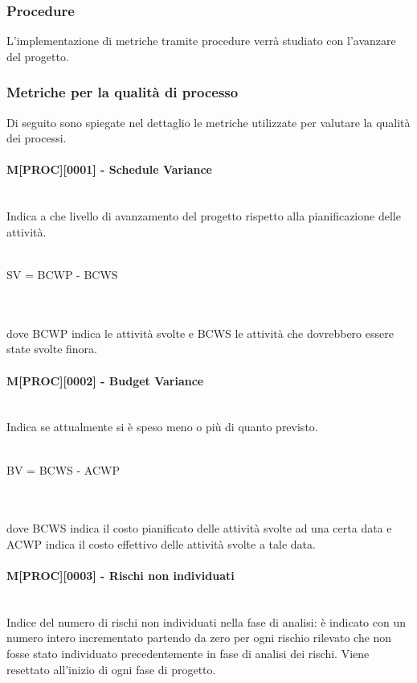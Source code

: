 \subsubsection{Procedure}
L'implementazione di metriche tramite procedure verrà studiato con l'avanzare del progetto.

\subsubsection{Metriche per la qualità di processo}
Di seguito sono spiegate nel dettaglio le metriche utilizzate per valutare la qualità dei processi.

\paragraph{M[PROC][0001] - Schedule Variance} ~\\Indica a che livello di avanzamento del progetto rispetto alla pianificazione delle attività.
~\\\\
\centerline{SV = BCWP - BCWS}
\\\\dove BCWP indica le attività svolte e BCWS le attività che dovrebbero essere state svolte finora.

\paragraph{M[PROC][0002] - Budget Variance}
~\\Indica se attualmente si è speso meno o più di quanto previsto.
~\\\\
\centerline{BV = BCWS - ACWP}
\\\\dove BCWS indica il costo pianificato delle attività svolte ad una certa data e ACWP indica il costo effettivo delle attività svolte a tale data.

\paragraph{M[PROC][0003] - Rischi non individuati}
~\\Indice del numero di rischi non individuati nella fase di analisi: è indicato con un numero intero incrementato partendo da zero per ogni rischio rilevato che non fosse stato individuato precedentemente in fase di analisi dei rischi. Viene resettato all'inizio di ogni fase di progetto.


